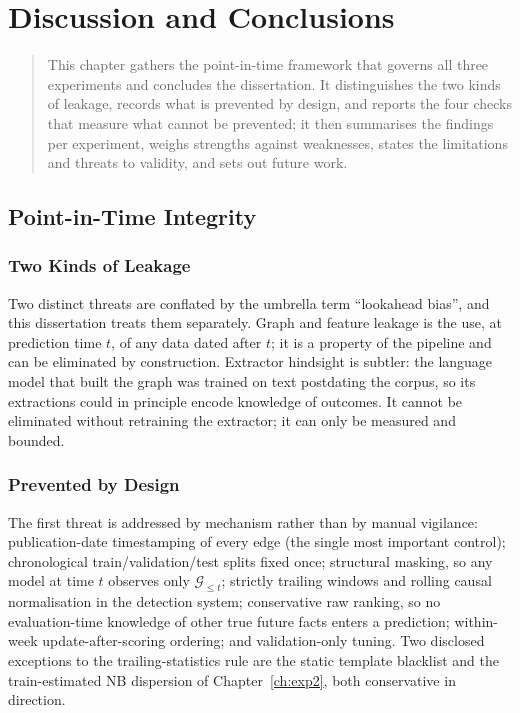 \documentclass[a4paper,12pt]{report}
\newenvironment{microabstract}{\begin{quotation}\noindent}{\end{quotation}}
\newcommand{\Gle}{\ensuremath{\mathcal{G}_{\leq t}}} %
\begin{document}
\chapter{Discussion and Conclusions}
\label{ch:conclusions}
\begin{microabstract}
This chapter gathers the point-in-time framework that governs all three
experiments and concludes the dissertation. It distinguishes the two
kinds of leakage, records what is prevented by design, and reports the
four checks that measure what cannot be prevented; it then summarises
the findings per experiment, weighs strengths against weaknesses,
states the limitations and threats to validity, and sets out future
work.
\end{microabstract}

\section{Point-in-Time Integrity}
\label{ch:pit}
\subsection{Two Kinds of Leakage}
Two distinct threats are conflated by the umbrella term ``lookahead bias'',
and this dissertation treats them separately. Graph and feature
leakage is the use, at prediction time $t$, of any data dated after $t$; it
is a property of the pipeline and can be eliminated by construction.
Extractor hindsight is subtler: the language model that built the
graph was trained on text postdating the corpus, so its extractions could in
principle encode knowledge of outcomes. It cannot be eliminated without
retraining the extractor; it can only be measured and bounded.

\subsection{Prevented by Design}
The first threat is addressed by mechanism rather than by manual
vigilance: publication-date
timestamping of every edge (the single most important control); chronological
train/validation/test splits fixed once; structural masking, so any model at
time $t$ observes only \Gle; strictly trailing windows and rolling causal
normalisation in the detection system; conservative raw ranking, so no
evaluation-time knowledge of other true future facts enters a prediction;
within-week update-after-scoring ordering; and validation-only tuning. Two
disclosed exceptions to the trailing-statistics rule are the static template
blacklist and the train-estimated NB dispersion of Chapter~\ref{ch:exp2},
both conservative in direction.
\end{document}
